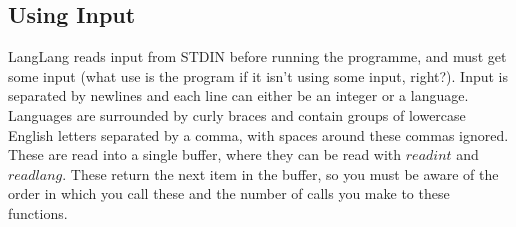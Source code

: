 \subsection{Using Input}
\label{input}
\begin{normalsize}
LangLang reads input from STDIN before running the programme, and must get some input (what use is the program if it isn't using some input, right?). Input is separated by newlines and each line can either be an integer or a language. Languages are surrounded by curly braces and contain groups of lowercase English letters separated by a comma, with spaces around these commas ignored. These are read into a single buffer, where they can be read with $readint$ and $readlang$. These return the next item in the buffer, so you must be aware of the order in which you call these and the number of calls you make to these functions.
\end{normalsize}